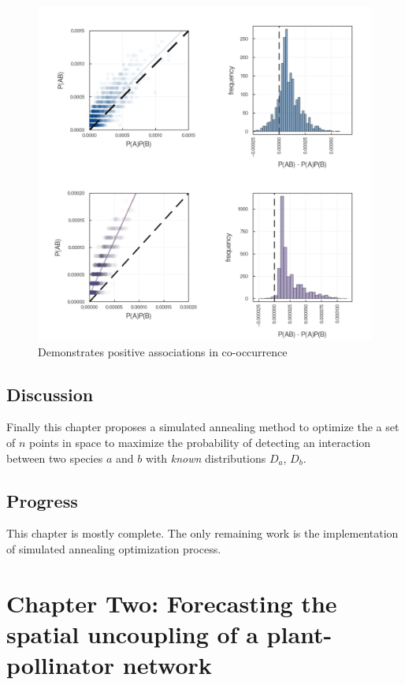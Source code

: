 \documentclass[11pt]{article}
\makeatletter
\def\maxwidth{\ifdim\Gin@nat@width>\linewidth\linewidth
\else\Gin@nat@width\fi}
\let\Oldincludegraphics\includegraphics
\renewcommand{\includegraphics}[1]{\Oldincludegraphics[width=\maxwidth]{#1}}
\makeatother
\begin{document}
\begin{figure}
\hypertarget{fig:posassoc}{%
\centering
\includegraphics{./figures/positiveassociations.png}
\caption{Demonstrates positive associations in
co-occurrence}\label{fig:posassoc}
}
\end{figure}

\hypertarget{discussion}{%
\subsection{Discussion}\label{discussion}}

Finally this chapter proposes a simulated annealing method to optimize
the a set of \(n\) points in space to maximize the probability of
detecting an interaction between two species \(a\) and \(b\) with
\emph{known} distributions \(D_a\), \(D_b\).

\hypertarget{progress}{%
\subsection{Progress}\label{progress}}

This chapter is mostly complete. The only remaining work is the
implementation of simulated annealing optimization process.

\hypertarget{chapter-two-forecasting-the-spatial-uncoupling-of-a-plant-pollinator-network}{%
\section{Chapter Two: Forecasting the spatial uncoupling of a
plant-pollinator
network}\label{chapter-two-forecasting-the-spatial-uncoupling-of-a-plant-pollinator-network}}
\end{document}
